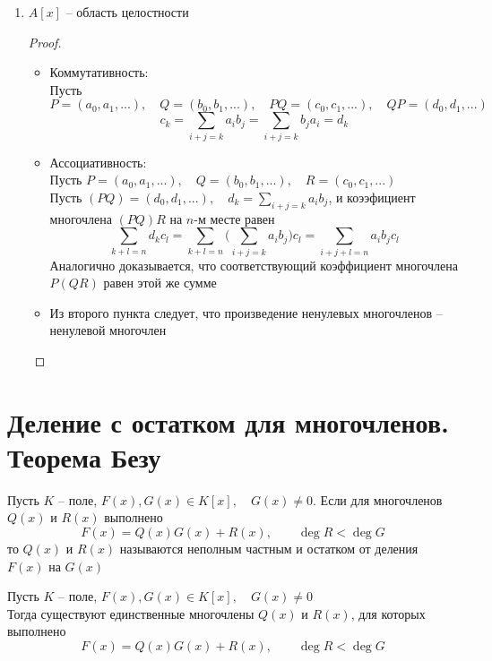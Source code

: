 \begin{theorem}
\begin{enumerate}
\begin{proof}
			Докажем, что $c_n = 0$ при $i > k + m$:
			$$ c_n = \sum_{i + j = k + m}a_ib_j $$
			для каждой пары $(i, j)$ выполнено $ i > k$ или $j > m$, следовательно, в каждом слагаемом хотя бы один из сомножителей равен 0
		\end{proof}
		\item $A[x]$ -- область целостности
		\begin{proof}
			\hfill
			\begin{itemize}
				\item Коммутативность: \\
				Пусть $P = (a_0, a_1, ...), \quad Q = (b_0, b_1, ...), \quad PQ = (c_0, c_1, ...), \quad QP = (d_0, d_1, ...) $
				$$ c_k = \sum_{i + j = k}a_ib_j = \sum_{i + j = k}b_ja_i = d_k $$
				\item Ассоциативность: \\
				Пусть $P = (a_0, a_1, ...), \quad Q = (b_0, b_1, ...), \quad R = (c_0, c_1, ...) $ \\
				Пусть $(PQ) = (d_0, d_1, ...), \quad d_k = \sum_{i + j = k}a_ib_j$, и коээфициент многочлена $(PQ)R$ на $n$-м месте равен
				$$ \sum_{k + l = n}d_kc_l = \sum_{k + l = n} \bigg( \sum_{i + j = k}a_ib_j \bigg)c_l = \sum_{i + j + l = n}a_ib_jc_l $$
				Аналогично доказывается, что соответствующий коэффициент многочлена $P(QR)$ равен этой же сумме
				\item Из второго пункта следует, что произведение ненулевых многочленов -- ненулевой многочлен
			\end{itemize}
		\end{proof}
	\end{enumerate}
\end{theorem}

\section{Деление с остатком для многочленов. Теорема Безу}

\begin{definition}
	Пусть $K$ -- поле, $F(x), G(x) \in K[x], \quad G(x) \ne 0$. Если для многочленов $Q(x)$ и $R(x)$ выполнено
	$$ F(x) = Q(x)G(x) + R(x), \qquad \deg R < \deg G $$
	то $Q(x)$ и $R(x)$ называются неполным частным и остатком от деления $F(x)$ на $G(x)$
\end{definition}

\begin{theorem}
	Пусть $K$ -- поле, $F(x), G(x) \in K[x], \quad G(x) \ne 0 $ \\
	Тогда существуют единственные многочлены $Q(x)$ и $R(x)$, для которых выполнено
	$$ F(x) = Q(x)G(x) + R(x), \qquad \deg R < \deg G $$
\end{theorem}

